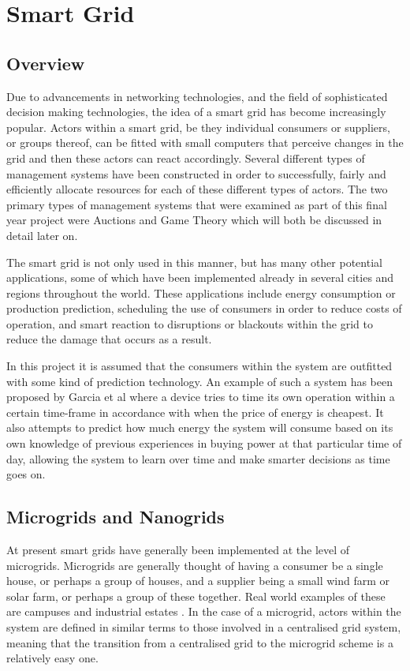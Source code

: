 \documentclass[a4paper, notitlepage]{report}
\begin{document}
\chapter{Smart Grid}
\label{sec:org01ee206}
\section{Overview}
\label{sec:org1e94b97}
Due to advancements in networking technologies, and the field of sophisticated
decision making technologies, the idea of a smart grid has become increasingly
popular. Actors within a smart grid, be they individual consumers or suppliers,
or groups thereof, can be fitted with small computers that perceive changes in
the grid and then these actors can react accordingly. Several different types of
management systems have been constructed in order to successfully, fairly and
efficiently allocate resources for each of these different types of actors. The
two primary types of management systems that were examined as part of this final
year project were Auctions and Game Theory which will both be discussed in
detail later on. 

The smart grid is not only used in this manner, but has many other potential
applications, some of which have been implemented already in several cities and
regions throughout the world. These applications include energy consumption or
production prediction, scheduling the use of consumers in order to reduce costs
of operation, and smart reaction to disruptions or blackouts within the grid to
reduce the damage that occurs as a result. 

In this project it is assumed that the consumers within the system are outfitted
with some kind of prediction technology. An example of such a system has been
proposed by Garcia et al \cite{mohsenian2010optimal} where a device tries to time
its own operation within a certain time-frame in accordance with when the price
of energy is cheapest. It also attempts to predict how much energy the system
will consume based on its own knowledge of previous experiences in buying power
at that particular time of day, allowing the system to learn over time and make
smarter decisions as time goes on. 
\section{Microgrids and Nanogrids}
\label{sec:orgc9088a3}
At present smart grids have generally been implemented at the level of
microgrids. Microgrids are generally thought of having a consumer be a single
house, or perhaps a group of houses, and a supplier being a small wind farm or
solar farm, or perhaps a group of these together. Real world examples of these
are campuses and industrial estates \cite{markvart2006microgrids}. In the case of
a microgrid, actors within the system are defined in similar terms to those
involved in a centralised grid system, meaning that the transition from a
centralised grid to the microgrid scheme is a relatively easy one.
\end{document}
